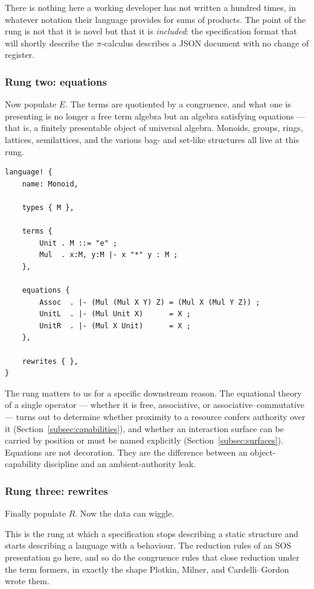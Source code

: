 \documentclass[11pt]{article}
\theoremstyle{definition}
\theoremstyle{plain}
\theoremstyle{remark}
\begin{document}
There is nothing here a working developer has not written a hundred times, in whatever
notation their language provides for sums of products. The point of the rung is not
that it is novel but that it is \emph{included}: the specification format that will
shortly describe the $\pi$-calculus describes a JSON document with no change of
register.

\subsubsection{Rung two: equations}

Now populate $E$. The terms are quotiented by a congruence, and what one is presenting
is no longer a free term algebra but an algebra satisfying equations --- that is, a
finitely presentable object of universal algebra. Monoids, groups, rings, lattices,
semilattices, and the various bag- and set-like structures all live at this rung.

\begin{lstlisting}
language! {
    name: Monoid,

    types { M },

    terms {
        Unit . M ::= "e" ;
        Mul  . x:M, y:M |- x "*" y : M ;
    },

    equations {
        Assoc  . |- (Mul (Mul X Y) Z) = (Mul X (Mul Y Z)) ;
        UnitL  . |- (Mul Unit X)      = X ;
        UnitR  . |- (Mul X Unit)      = X ;
    },

    rewrites { },
}
\end{lstlisting}

The rung matters to us for a specific downstream reason. The equational theory of a
single operator --- whether it is free, associative, or associative--commutative ---
turns out to determine whether proximity to a resource confers authority over it
(Section~\ref{subsec:capabilities}), and whether an interaction surface can be carried
by position or must be named explicitly (Section~\ref{subsec:surfaces}). Equations are
not decoration. They are the difference between an object-capability discipline and an
ambient-authority leak.

\subsubsection{Rung three: rewrites}

Finally populate $R$. Now the data can wiggle.

This is the rung at which a specification stops describing a static structure and
starts describing a language with a behaviour. The reduction rules of an SOS
presentation go here, and so do the congruence rules that close reduction under the
term formers, in exactly the shape Plotkin, Milner, and Cardelli--Gordon wrote them.
\end{document}
